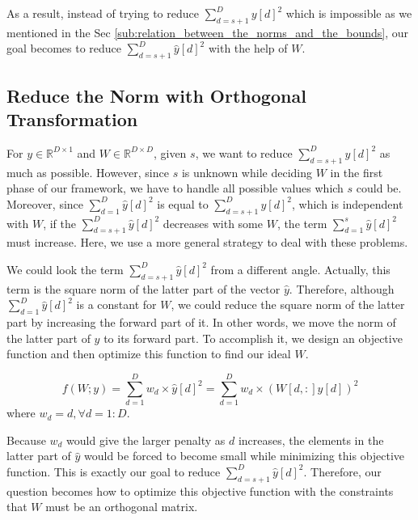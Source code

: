 As a result, instead of trying to reduce $\sum^D_{d=s+1}{y[d]^2}$ which is impossible as we mentioned in the Sec \ref{sub:relation_between_the_norms_and_the_bounds}, our goal becomes to reduce $\sum^D_{d=s+1}{\hat{y}[d]^2}$ with the help of $W$.


\subsection{Reduce the Norm with Orthogonal Transformation} %
\label{ss:reduce_the_norm_with_orthogonal_transformation}

For $y\in \mathbb{R}^{D\times 1}$ and $W\in\mathbb{R}^{D\times D}$, given $s$, we want to reduce $\sum^D_{d=s+1}{\hat{y}[d]^2}$ as much as possible.  However, since $s$ is unknown while deciding $W$ in the first phase of our framework, we have to handle all possible values which $s$ could be.  Moreover, since $\sum^D_{d=1}{\hat{y}[d]^2}$ is equal to $\sum^D_{d=s+1}{y[d]^2}$, which is independent with $W$, if the $\sum^D_{d=s+1}{\hat{y}[d]^2}$ decreases with some $W$, the term $\sum^s_{d=1}{\hat{y}[d]^2}$ must increase.  Here, we use a more general strategy to deal with these problems.

We could look the term $\sum^D_{d=s+1}{\hat{y}[d]^2}$ from a different angle.  Actually, this term is the square norm of the latter part of the vector $\hat{y}$. Therefore, although $\sum^D_{d=1}{\hat{y}[d]^2}$ is a constant for $W$, we could reduce the square norm of the latter part by increasing the forward part of it.  In other words, we move the norm of the latter part of $y$ to its forward part.  To accomplish it, we design an objective function and then optimize this function to find our ideal $W$.

\begin{equation}\label{objective}
	f(W;y)=\sum^D_{d=1}{w_d\times\hat{y}[d]^2}=\sum^D_{d=1}{w_d\times(W[d,:]y[d])^2}
\end{equation}
where $w_d=d,  \forall d=1:D$.

Because $w_d$ would give the larger penalty as $d$ increases, the elements in the latter part of $\hat{y}$ would be forced to become small while minimizing this objective function.  This is exactly our goal to reduce $\sum^D_{d=s+1}{\hat{y}[d]^2}$.  Therefore, our question becomes how to optimize this objective function with the constraints that $W$ must be an orthogonal matrix.


